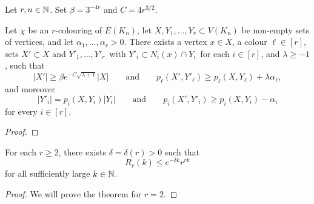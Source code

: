 \begin{lemma}
    \label{lem:key-lemma}

    Let $r, n\in\mathbb{N}$. Set $\beta = 3^{-4r}$ and $C = 4r^{3/2}$.

    Let\/ $\chi$ be an\/ $r$-colouring of\/ $E(K_n)$, let\/ $X,Y_1,\ldots,Y_r \subset V(K_n)$ be non-empty sets of vertices, and let $\alpha_1,\ldots,\alpha_r > 0$. There exists a vertex $x \in X$, a colour $\ell \in [r]$, sets $X' \subset X$ and\/ $Y'_1,\ldots,Y'_r\,$ with\/ $Y'_i \subset N_i(x) \cap Y_i\,$ for each $i \in [r]$, and\/ $\lambda \ge -1$, such that 
    \begin{equation}\label{eq:key:ell}
    |X'| \ge \beta e^{- C \sqrt{\lambda + 1}} |X| \qquad \text{and} \qquad p_\ell( X', Y'_\ell ) \ge p_\ell(X,Y_\ell) + \lambda \alpha_\ell,
    \end{equation}
    and moreover
    \begin{equation}\label{eq:key:alli}
    |Y'_i| = p_i(X,Y_i) |Y_i| \qquad \text{and} \qquad p_i( X', Y'_i ) \ge p_i(X,Y_i) - \alpha_i
    \end{equation}
    for every $i \in [r]$.
    \end{lemma}

\begin{proof}
\end{proof}



\begin{theorem}[Balister et al. 2024] \label{thm:Ramsey-multicolour}
    For each $r \ge 2$, there exists $\delta = \delta(r) > 0$ such that 
    \begin{equation*}
        R_r(k) \le e^{-\delta k} r^{rk}
    \end{equation*} 
    for all sufficiently large $k \in \mathbb{N}$. 
\end{theorem}

\begin{proof}
    We will prove the theorem for $r = 2$.
\end{proof}
